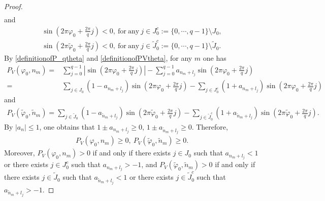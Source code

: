 \documentclass[12pt]{amsart}
\newcommand{\abs}[1]{\left\lvert #1 \right\rvert}
\theoremstyle{plain}
\theoremstyle{definition}
\begin{document}
\begin{proof}
\begin{align}
\end{align}
and
\begin{align}
		\sin \left(2\pi\varphi_0+\frac{2\pi}{q}j\right)<0,\ \mathrm{for\ any}\ j\in J_0^c:= \{0,\cdots,q-1\}\setminus J_0,\label{lem3.5sintheta0<0}\\
	\sin \left(2\pi\tilde{\varphi}_0+\frac{2\pi}{q}j\right)<0,\ \mathrm{for\ any}\ j\in \tilde{J}_0^c:= \{0,\cdots,q-1\}\setminus\tilde{J}_0.\label{lem3.5sinthetatilde0<0}
\end{align}
By \eqref{definitionofP_qtheta} and \eqref{definitionofPVtheta}, for any $m$ one has
\begin{align}
	P_V(\varphi_0,n_m)=&\sum_{j=0}^{q-1}\abs{\sin\left(2\pi\varphi_0+\frac{2\pi}{q}j\right)}-\sum_{j=0}^{q-1}a_{n_m+l_j}\sin\left(2\pi\varphi_0+\frac{2\pi}{q}j\right)\nonumber\\
	=&\sum_{j\in J_0}(1-a_{n_m+l_j})\sin\left(2\pi\varphi_0+\frac{2\pi}{q}j\right)-\sum_{j\in J_0^c}(1+a_{n_m+l_j})\sin\left(2\pi\varphi_0+\frac{2\pi}{q}j\right)\label{PVexpansion}
\end{align}
and
\begin{align}
		P_V(\tilde{\varphi}_0,\tilde{n}_m)
	=\sum_{j\in \tilde{J}_0}(1-a_{\tilde{n}_m+l_j})\sin\left(2\pi\tilde{\varphi}_0+\frac{2\pi}{q}j\right)-\sum_{j\in \tilde{J}_0^c}(1+a_{\tilde{n}_m+l_j})\sin\left(2\pi\tilde{\varphi}_0+\frac{2\pi}{q}j\right).\label{PVtildeexpansion}
\end{align}
By $\abs{a_n}\leq 1$, one obtains that $1\pm a_{n_m+l_j}\geq 0$, $1\pm a_{\tilde{n}_m+l_j}\geq 0$. Therefore, \begin{align}
	P_V(\varphi_0,n_m)\geq 0,\ P_V(\tilde{\varphi}_0,\tilde{n}_m)\geq 0.\label{PVl0}
\end{align} 
Moreover, $P_V(\varphi_0,n_m)> 0$ if and only if there exists $j\in J_0$ such that $a_{n_m+l_j}<1$ or there exists $j\in J_0^c$ such that $a_{n_m+l_j}>-1$,  and $	P_V(\tilde{\varphi}_0,\tilde{n}_m)>0$ if and only if  there exists $j\in \tilde{J}_0$ such that $a_{\tilde{n}_m+l_j}<1$ or there exists $j\in \tilde{J}_0^c$ such that $a_{\tilde{n}_m+l_j}>-1$.


\end{proof}
\end{document}

